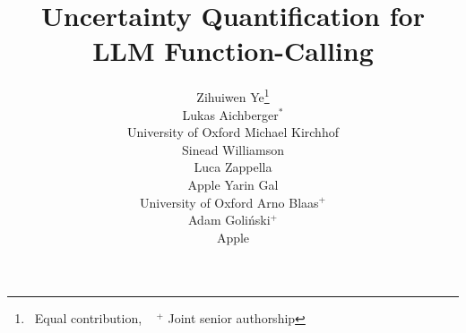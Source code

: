 \documentclass[10pt]{article} %
\title{Uncertainty Quantification for LLM Function-Calling}
\author{\name Zihuiwen Ye\thanks{~Equal contribution, ~ $^+$ Joint senior authorship} \\
\name Lukas Aichberger$^*$ \\
\addr University of Oxford
\ANDAUTHOR
\name Michael Kirchhof \\
\name Sinead Williamson \\
\name Luca Zappella \\
\addr Apple
\ANDAUTHOR
\name Yarin Gal \\
\addr University of Oxford
\ANDAUTHOR
\name Arno Blaas$^+$ \\
\name Adam Goli{\'n}ski$^+$ \\
\addr Apple 
}
\begin{document}
\maketitle




\begin{abstract}

\end{abstract}











\newpage
\appendix

\end{document}
